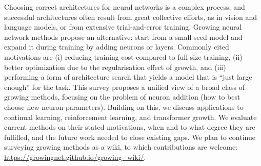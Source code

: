 Choosing correct architectures for neural networks is a complex process, and successful architectures often result from great collective efforts, as in vision and language models, or from extensive trial-and-error training. Growing neural network methods propose an alternative: start from a small seed model and expand it during training by \eg{} adding neurons or layers. Commonly cited motivations are (i) reducing training cost compared to full-size training, (ii) better optimization due to the regularisation effect of growth, and (iii) performing a form of architecture search that yields a model that is ``just large enough'' for the task.
This survey proposes a unified view of a broad class of growing methods, focusing on the problem of neuron addition (how to best choose new neuron parameters). Building on this, we discuss applications to continual learning, reinforcement learning, and transformer growth.
We evaluate current methods on their stated motivations, when and to what degree they are fulfilled, and the future work needed to close existing gaps.
We plan to continue surveying growing methods as a wiki, to which contributions are welcome: \url{https://growingnet.github.io/growing_wiki/}.
